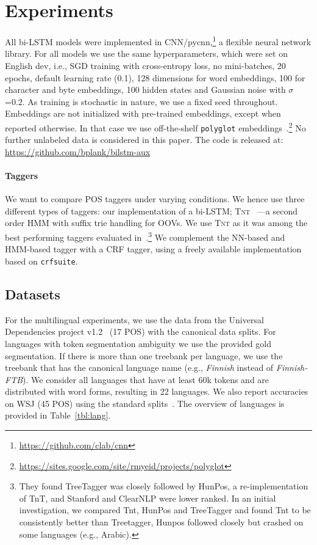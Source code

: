 \documentclass[11pt]{article}
\begin{document}
 
\section{Experiments} 
All bi-LSTM models were implemented in CNN/pycnn,\footnote{\url{https://github.com/clab/cnn}} a flexible neural network library. For all models we use the same hyperparameters, which were set on English dev, i.e., SGD training with cross-entropy loss, no mini-batches, 20 epochs, default learning rate (0.1), 128 dimensions for word embeddings, 100 for character and byte embeddings, 100 hidden states and Gaussian noise with $\sigma$=0.2. As training is stochastic in nature, we use a fixed seed throughout. Embeddings are not initialized with pre-trained embeddings, except when reported otherwise. In that case we use off-the-shelf \texttt{polyglot} embeddings~\cite{polyglot:2013}.\footnote{\url{https://sites.google.com/site/rmyeid/projects/polyglot}} No further unlabeled data is considered in this paper. The code is released at: \url{https://github.com/bplank/bilstm-aux} 

\paragraph{Taggers} We want to compare POS taggers under varying conditions. We hence use three different types of taggers: our implementation of a bi-LSTM; \textsc{Tnt}~\cite{brants2000tnt}%
---a second order HMM with suffix trie handling for OOVs. We use \textsc{Tnt} as it was among the best performing taggers evaluated in~.\footnote{They found TreeTagger was closely followed by HunPos, a re-implementation of TnT, and Stanford  and ClearNLP were lower ranked. In an initial investigation, we compared Tnt, HunPos and TreeTagger and found Tnt to be consistently better than Treetagger, Hunpos followed closely but crashed on some languages (e.g., Arabic).} We complement the NN-based and HMM-based tagger with a CRF tagger, using a freely available implementation~\cite{Plank:ea:14:coling} based on \texttt{crfsuite}. %

\subsection{Datasets}

For the multilingual experiments, we use the data from the Universal Dependencies project v1.2~\cite{universal1.2} (17 POS) with the canonical data splits. 
For languages with token segmentation ambiguity we use the provided gold segmentation. If there is more than one treebank per language, we use the treebank that has the canonical language name (e.g.,  \emph{Finnish} instead of \emph{Finnish-FTB}). 
We consider all languages that have at least 60k tokens and are distributed with word forms, resulting in 22 languages. 
We also report accuracies on WSJ (45 POS) using the standard splits~\cite{Collins:02,Manning:11}. The overview of languages is provided in Table~\ref{tbl:lang}.
\end{document}
